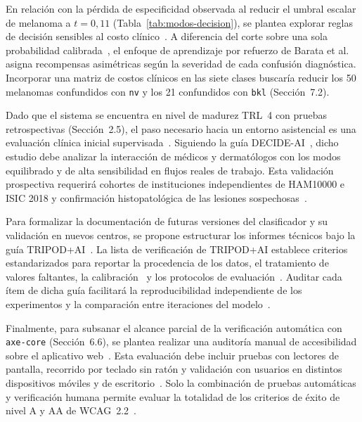 En relación con la pérdida de especificidad observada al reducir el umbral escalar de melanoma a $t = 0{,}11$ (Tabla~\ref{tab:modos-decision}), se plantea explorar reglas de decisión sensibles al costo clínico~\cite{barata2023reinforcement}. A diferencia del corte sobre una sola probabilidad calibrada~\cite{guo2017calibration}, el enfoque de aprendizaje por refuerzo de Barata et al.~\cite{barata2023reinforcement} asigna recompensas asimétricas según la severidad de cada confusión diagnóstica. Incorporar una matriz de costos clínicos en las siete clases buscaría reducir los 50 melanomas confundidos con \texttt{nv} y los 21 confundidos con \texttt{bkl} (Sección~7.2).

Dado que el sistema se encuentra en nivel de madurez TRL~4 con pruebas retrospectivas (Sección~2.5), el paso necesario hacia un entorno asistencial es una evaluación clínica inicial supervisada~\cite{vasey2022decideai}. Siguiendo la guía DECIDE-AI~\cite{vasey2022decideai}, dicho estudio debe analizar la interacción de médicos y dermatólogos con los modos equilibrado y de alta sensibilidad en flujos reales de trabajo. Esta validación prospectiva requerirá cohortes de instituciones independientes de HAM10000 e ISIC 2018 y confirmación histopatológica de las lesiones sospechosas~\cite{amaral2025esmo,marchetti2023proveai,heinlein2024multicenter}.

Para formalizar la documentación de futuras versiones del clasificador y su validación en nuevos centros, se propone estructurar los informes técnicos bajo la guía TRIPOD+AI~\cite{collins2024tripodai}. La lista de verificación de TRIPOD+AI establece criterios estandarizados para reportar la procedencia de los datos, el tratamiento de valores faltantes, la calibración~\cite{sambyal2023calibration,penso2024calibration} y los protocolos de evaluación~\cite{collins2024tripodai}. Auditar cada ítem de dicha guía facilitará la reproducibilidad independiente de los experimentos y la comparación entre iteraciones del modelo~\cite{collins2024tripodai,maierhein2024metrics}.

Finalmente, para subsanar el alcance parcial de la verificación automática con \texttt{axe-core} (Sección~6.6), se plantea realizar una auditoría manual de accesibilidad sobre el aplicativo web~\cite{w3c2023wcag22}. Esta evaluación debe incluir pruebas con lectores de pantalla, recorrido por teclado sin ratón y validación con usuarios en distintos dispositivos móviles y de escritorio~\cite{w3c2023wcag22,wang2025browser}. Solo la combinación de pruebas automáticas y verificación humana permite evaluar la totalidad de los criterios de éxito de nivel A y AA de WCAG~2.2~\cite{w3c2023wcag22}.
